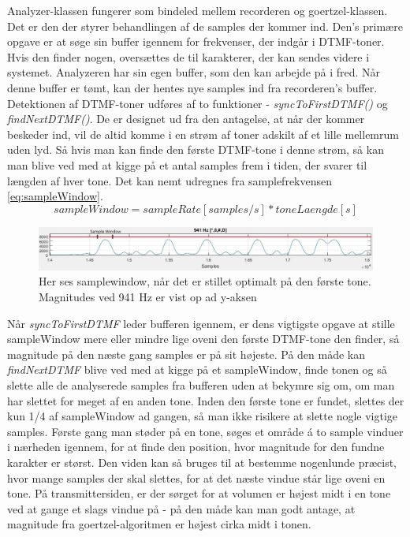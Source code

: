 Analyzer-klassen fungerer som bindeled mellem recorderen og goertzel-klassen. Det er den der styrer behandlingen af de samples der kommer ind. Den's primære opgave er at søge sin buffer igennem for frekvenser, der indgår i DTMF-toner. Hvis den finder nogen, oversættes de til karakterer, der kan sendes videre i systemet. Analyzeren har sin egen buffer, som den kan arbejde på i fred. Når denne buffer er tømt, kan der hentes nye samples ind fra recorderen's buffer. \\

Detektionen af DTMF-toner udføres af to funktioner - \textit{syncToFirstDTMF()} og \textit{findNextDTMF()}. De er designet ud fra den antagelse, at når der kommer beskeder ind, vil de altid komme i en strøm af toner adskilt af et lille mellemrum uden lyd. Så hvis man kan finde den første DTMF-tone i denne strøm, så kan man blive ved med at kigge på et antal samples frem i tiden, der svarer til længden af hver tone. Det kan nemt udregnes fra samplefrekvensen \eqref{eq:sampleWindow}. \\

\begin{equation}
sampleWindow=sampleRate[samples/s]*toneLaengde[s]
\label{eq:sampleWindow}
\end{equation}

\begin{figure}[h]
\centering
\includegraphics[scale=0.5]{Billeder/Samplewindow.PNG}
\caption{Her ses samplewindow, når det er stillet optimalt på den første tone. Magnitudes ved 941 Hz er vist op ad y-aksen}
\label{fig:Samplewindow}
\end{figure}

Når \textit{syncToFirstDTMF} leder bufferen igennem, er dens vigtigste opgave at stille sampleWindow mere eller mindre lige oveni den første DTMF-tone den finder, så magnitude på den næste gang samples er på sit højeste. På den måde kan \textit{findNextDTMF} blive ved med at kigge på et sampleWindow, finde tonen og så slette alle de analyserede samples fra bufferen uden at bekymre sig om, om man har slettet for meget af en anden tone. Inden den første tone er fundet, slettes der kun 1/4 af sampleWindow ad gangen, så man ikke risikere at slette nogle vigtige samples. Første gang man støder på en tone, søges et område á to sample vinduer i nærheden igennem, for at finde den position, hvor magnitude for den fundne karakter er størst. Den viden kan så bruges til at bestemme nogenlunde præcist, hvor mange samples der skal slettes, for at det næste vindue står lige oveni en tone. På transmittersiden, er der sørget for at volumen er højest midt i en tone ved at gange et slags vindue på - på den måde kan man godt antage, at magnitude fra goertzel-algoritmen er højest cirka midt i tonen.

